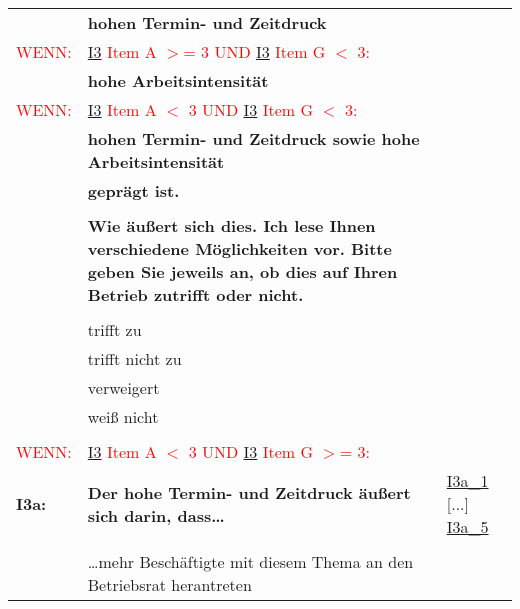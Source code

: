 \begin{longtable}{!{\color{black}\vline width 1pt}  L{2cm}!{\color{black}\vline width 1pt} L{12.25cm}!{\color{black}\vline width 1pt}  L{2.5cm}!{\color{black}\vline width 1pt}}
   & \textbf{hohen Termin- und Zeitdruck } &  \\ 
  \textcolor{red}{WENN:} & \textcolor{red}{ \hyperref[I3]{I3} Item A $>$= 3 UND  \hyperref[I3]{I3} Item G $<$ 3:} &  \\ 
   & \textbf{hohe Arbeitsintensität } &  \\ 
  \textcolor{red}{WENN:} & \textcolor{red}{ \hyperref[I3]{I3} Item A $<$ 3 UND  \hyperref[I3]{I3} Item G $<$ 3:} &  \\ 
   & \textbf{hohen Termin- und Zeitdruck sowie hohe Arbeitsintensität } &  \\ 
   & \textbf{geprägt ist. } &  \\ 
   &  &  \\ 
   & \textbf{Wie äußert sich dies. Ich lese Ihnen verschiedene Möglichkeiten vor. Bitte geben Sie jeweils an, ob dies auf Ihren Betrieb zutrifft oder nicht.} &  \\ 
   &  &  \\ 
   & trifft zu &  \\ 
   & trifft nicht zu &  \\ 
   & verweigert &  \\ 
   & weiß nicht &  \\ 
   &  &  \\ 
   \midrule
{}\textcolor{red}{WENN:} & \textcolor{red}{ \hyperref[I3]{I3} Item A $<$ 3 UND  \hyperref[I3]{I3} Item G $>$= 3:} &  \\ 
  \textbf{I3a:}\label{I3a} & \textbf{Der hohe Termin- und Zeitdruck äußert sich darin, dass…} & \hyperref[var:I3a:1]{I3a\_1} [...] \hyperref[var:I3a:5]{I3a\_5} \\ 
   &  &  \\ 
   & …mehr Beschäftigte mit diesem Thema an den Betriebsrat herantreten &  \\ 

\end{longtable}
